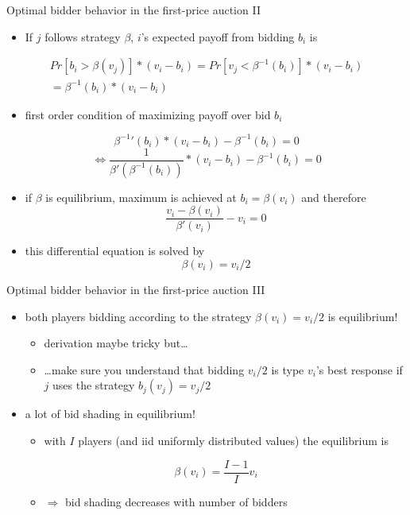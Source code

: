 \documentclass[bigger]{beamer}
\newcommand{\Ra}{\Rightarrow} \newcommand{\ra}{\rightarrow} \newcommand{\Lra}{\Leftrightarrow}
\begin{document}
\begin{frame}[label={sec:orgdf3f7b5}]{Optimal bidder behavior in the ﬁrst-price auction II}
\begin{itemize}
\item If \(j\) follows strategy \(\beta\), \(i\)'s expected payoff from bidding \(b_i\) is
\end{itemize}
\begin{multline*}Pr[b_i>\beta(v_j)]*(v_i-b_i)= Pr[v_j<\beta^{-1}(b_i)]*(v_i-b_i)\\
= \beta^{-1}(b_i)*(v_i-b_i)
\end{multline*}
\vspace*{-0.5cm}
\begin{itemize}
\item first order condition of maximizing payoff over bid \(b_i\)
\end{itemize}
$$ {\beta^{-1}}'(b_i)*(v_i-b_i)-\beta^{-1}(b_i)=0$$
$$\Lra \frac{1}{\beta'(\beta^{-1}(b_i))}*(v_i-b_i)-\beta^{-1}(b_i)=0$$
\begin{itemize}
\item if \(\beta\) is equilibrium, maximum is achieved at \(b_i=\beta(v_i)\) and therefore
$$\frac{v_i-\beta(v_i)}{\beta'(v_i)}-v_i=0$$
\item this differential equation is solved by $$\beta(v_i)=v_i/2$$
\end{itemize}
\end{frame}

\begin{frame}[label={sec:org83df89c}]{Optimal bidder behavior in the ﬁrst-price auction III}
\begin{itemize}
\item both players bidding according to the strategy \(\beta(v_i)=v_i/2\) is equilibrium!
\begin{itemize}
\item derivation maybe tricky but\ldots{}
\item \ldots{}make sure you understand that bidding \(v_i/2\) is type \(v_i\)'s best response if \(j\) uses the strategy \(b_j(v_j)=v_j/2\)
\end{itemize}
\item a lot of bid shading in equilibrium!
\begin{itemize}
\item with \(I\) players (and iid uniformly distributed values) the equilibrium is
\end{itemize}
$$\beta(v_i)=\frac{I-1}{I}v_i$$
\begin{itemize}
\item \(\Ra\) bid shading decreases with number of bidders
\end{itemize}
\end{itemize}
\end{frame}
\end{document}
